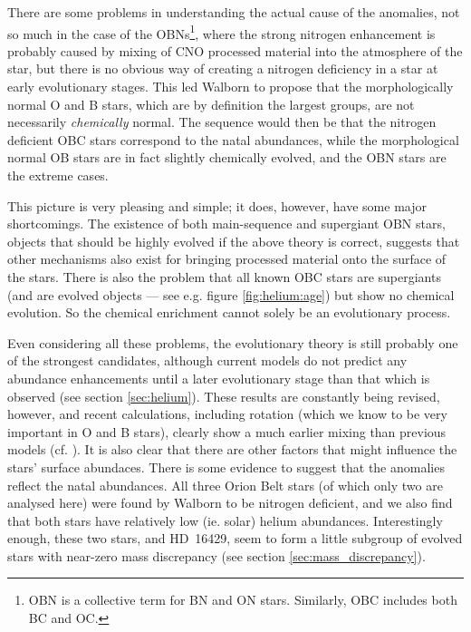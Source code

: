 There are some problems in understanding the actual cause of the
anomalies, not so much in the case of the OBNs\footnote{OBN is a
collective term for BN and ON stars. Similarly, OBC includes both BC
and OC.}, where the strong nitrogen enhancement is probably caused by
mixing of CNO processed material into the atmosphere of the star, but
there is no obvious way of creating a nitrogen deficiency in a star at
early evolutionary stages. This led Walborn to propose that the
morphologically normal O and B stars, which are by definition the
largest groups, are not necessarily \emph{chemically} normal. The sequence
would then be that the nitrogen deficient OBC stars correspond to the
natal abundances, while the morphological normal OB stars are in fact
slightly chemically evolved, and the OBN stars are the extreme cases.

This picture is very pleasing and simple; it does, however, have some
major shortcomings. The existence of both main-sequence and supergiant
OBN stars, objects that should be highly evolved if the above theory is
correct, suggests that other mechanisms also exist for bringing
processed material onto the surface of the stars. There is also the
problem that all known OBC stars are supergiants (and are evolved objects --- see
e.g. figure \ref{fig:helium:age}) but show no chemical evolution. So
the chemical enrichment cannot solely be an evolutionary process.

Even considering all these problems, the evolutionary theory is still
probably one of the strongest candidates, although current models do
not predict any abundance enhancements until a later evolutionary
stage than that which is observed (see section
\ref{sec:helium}). These results are constantly being revised,
however, and recent calculations, including rotation (which we know to
be very important in O and B stars), clearly show a much earlier
mixing than previous models (cf. \cite{me:98}).
It is also clear that there are other factors that might influence the
stars' surface abundaces. There is some evidence to suggest that the
anomalies reflect the natal abundances. All three Orion Belt stars (of
which only two are analysed here) were found by Walborn to be nitrogen
deficient, and we also find that both stars have relatively low (ie. solar)
helium abundances. Interestingly enough, these two stars, and HD~16429,
seem to form a little subgroup of evolved stars with near-zero mass
discrepancy (see section \ref{sec:mass_discrepancy}).

